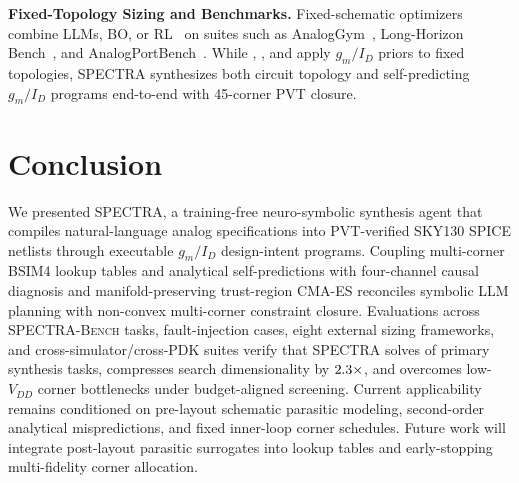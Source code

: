 \documentclass{article}
\theoremstyle{plain}
\begin{document}
\textbf{Fixed-Topology Sizing and Benchmarks.} Fixed-schematic optimizers combine LLMs, BO, or RL~\citep{settaluri2020autockt,wang2020gcnrl,yin2024adollm,kochar2025ledro,kim2025glova,ahmadzadeh2025anaflow,liu2026eesizer,yu2026autosizer,hao2026agenticsizing,oh2026atlas} on suites such as AnalogGym~\citep{li2024analoggym}, Long-Horizon Bench~\citep{adbench2026longhorizon}, and AnalogPortBench~\citep{rajabi2026analogportbench}. While \citet{long2026analogscout}, \citet{saxena2026opera}, and \citet{park2026craft} apply $g_m/I_D$ priors to fixed topologies, \textsc{SPECTRA} synthesizes both circuit topology and self-predicting $g_m/I_D$ programs end-to-end with 45-corner PVT closure.

\section{Conclusion}
\label{sec:conclusion}
We presented \textsc{SPECTRA}, a training-free neuro-symbolic synthesis agent that compiles natural-language analog specifications into PVT-verified SKY130 SPICE netlists through executable $g_m/I_D$ design-intent programs. Coupling multi-corner BSIM4 lookup tables and analytical self-predictions with four-channel causal diagnosis and manifold-preserving trust-region CMA-ES reconciles symbolic LLM planning with non-convex multi-corner constraint closure. Evaluations across \NTasksTotal{} \textsc{SPECTRA-Bench} tasks, \FaultN{} fault-injection cases, eight external sizing frameworks, and cross-simulator/cross-PDK suites verify that \textsc{SPECTRA} solves \SpectraPrim{} of primary synthesis tasks, compresses search dimensionality by $2.3{}\times$, and overcomes low-$V_{DD}$ corner bottlenecks under budget-aligned screening. Current applicability remains conditioned on pre-layout schematic parasitic modeling, second-order analytical mispredictions, and fixed inner-loop corner schedules. Future work will integrate post-layout parasitic surrogates into lookup tables and early-stopping multi-fidelity corner allocation.


\clearpage
\end{document}
